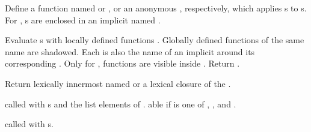 \begin{LIST}{1cm}
  
  {
    Define a function named  or , or an anonymous , respectively, which applies
    s to s. For , s are
    enclosed in an implicit  named .
  }

  {
    Evaluate s with
    locally defined functions . Globally defined functions of
    the same name are shadowed. Each  is also the name of an
    implicit  around its corresponding .
    Only for , functions  are visible inside
    . Return .
  }

  {
    Return lexically innermost  named  or a
    lexical closure of the .
  }

  {
     called with
    s and the list elements of . able if
     is one of , , and .
  }

  {
     called with s.
  }


\end{LIST}
